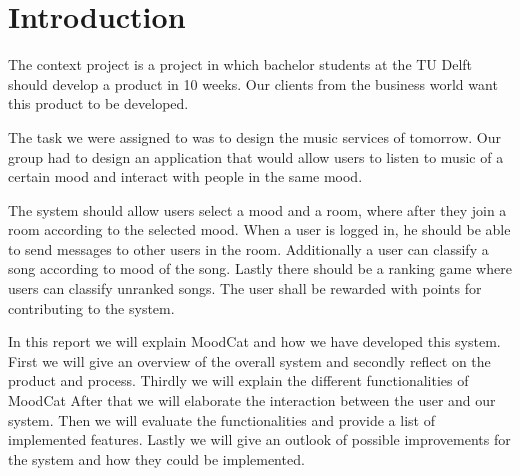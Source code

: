 \chapter{Introduction}

The context project is a project in which bachelor students at the TU Delft should develop a product in 10 weeks.
Our clients from the business world want this product to be developed.

The task we were assigned to was to design the music services of tomorrow.
Our group had to design an application that would allow users to listen to music of a certain mood and interact with people in the same mood.


The system should allow users select a mood and a room, where after they join a room according to the selected mood.
When a user is logged in, he should be able to send messages to other users in the room.
Additionally a user can classify a song according to mood of the song.
Lastly there should be a ranking game where users can classify unranked songs.
The user shall be rewarded with points for contributing to the system.


In this report we will explain MoodCat and how we have developed this system.
First we will give an overview of the overall system and secondly reflect on the product and process.
Thirdly we will explain the different functionalities of MoodCat After that we will elaborate the interaction between the user and our system.
Then we will evaluate the functionalities and provide a list of implemented features.
Lastly we will give an outlook of possible improvements for the system and how they could be implemented.